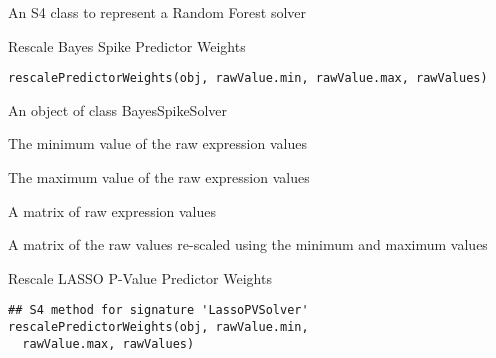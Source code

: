 \documentclass[a4paper]{book}
\begin{document}
%
\begin{Description}\relax
An S4 class to represent a Random Forest solver
\end{Description}
%
\begin{Description}\relax
Rescale Bayes Spike Predictor Weights
\end{Description}
%
\begin{Usage}
\begin{verbatim}
rescalePredictorWeights(obj, rawValue.min, rawValue.max, rawValues)
\end{verbatim}
\end{Usage}
%
\begin{Arguments}
\begin{ldescription}
\item[\code{obj}] An object of class BayesSpikeSolver

\item[\code{rawValue.min}] The minimum value of the raw expression values

\item[\code{rawValue.max}] The maximum value of the raw expression values

\item[\code{rawValues}] A matrix of raw expression values
\end{ldescription}
\end{Arguments}
%
\begin{Value}
A matrix of the raw values re-scaled using the minimum and maximum values
\end{Value}
%
\begin{Description}\relax
Rescale LASSO P-Value Predictor Weights
\end{Description}
%
\begin{Usage}
\begin{verbatim}
## S4 method for signature 'LassoPVSolver'
rescalePredictorWeights(obj, rawValue.min,
  rawValue.max, rawValues)
\end{verbatim}
\end{Usage}
\end{document}
